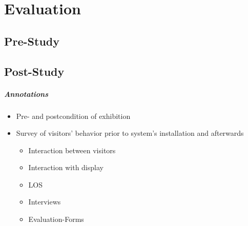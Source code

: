 \chapter{Evaluation}
\label{evaluation}


\section{Pre-Study}
\label{evaluation_pre}


\section{Post-Study}
\label{evaluation_post}

\paragraph{Annotations}

\begin{itemize}
	\item Pre- and postcondition of exhibition
	\item Survey of visitors' behavior prior to system's installation and afterwards
	\begin{itemize}
		\item Interaction between visitors
		\item Interaction with display
		\item \ac{LOS}
		\item Interviews
		\item Evaluation-Forms
	\end{itemize}
\end{itemize}
